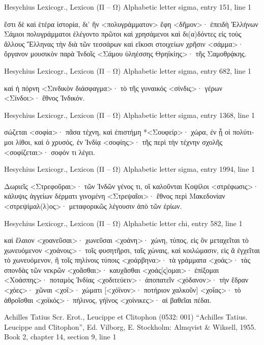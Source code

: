 \documentclass[12pt,letterpaper,twoside,final]{memoir}
\begin{document}
\begin{greek}
Hesychius Lexicogr., Lexicon (Π – Ω) 
Alphabetic letter sigma, entry 151, line 1

                                                        ἔστι δὲ καὶ ἑτέρα 
 ἱστορία, δι' ἣν <πολυγράμματον> ἔφη <δῆμον>· ἐπειδὴ Ἑλλήνων 
 Σάμιοι πολυγράμματοι ἐλέγοντο πρῶτοι καὶ χρησάμενοι καὶ δι(α)δόντες 
 εἰς τοὺς ἄλλους Ἕλληνας τὴν διὰ τῶν τεσσάρων καὶ εἴκοσι στοιχείων 
 χρῆσιν 
<σάμμα>· ὄργανον μουσικὸν παρὰ Ἰνδοῖς 
<Σάμου ὑληέσσης Θρηϊκίης>· τῆς Σαμοθρᾴκης. 



Hesychius Lexicogr., Lexicon (Π – Ω) 
Alphabetic letter sigma, entry 682, line 1

                             καὶ ἡ πόρνη 
<Σινδικὸν διάσφαγμα>· τὸ τῆς γυναικός 
<σίνδις>· γέρων 
<Σίνδοι>· ἔθνος Ἰνδικόν. 



Hesychius Lexicogr., Lexicon (Π – Ω) 
Alphabetic letter sigma, entry 1368, line 1

                                                 σώζεται 
<σοφία>· πᾶσα τέχνη, καὶ ἐπιστήμη 
*<Σουφείρ>· χώρα, ἐν ᾗ οἱ πολύτιμοι λίθοι, καὶ ὁ χρυσός, ἐν Ἰνδίᾳ 
<σοφίης>· τῆς περὶ τὴν τέχνην σχολῆς 
<σοφίζεται>· σοφόν τι λέγει. 



Hesychius Lexicogr., Lexicon (Π – Ω) 
Alphabetic letter sigma, entry 1994, line 1

                                          Δωριεῖς 
<Στρεφοῦραι>· τῶν Ἰνδῶν γένος τι, οἳ καλοῦνται Κοψίλοι 
<στρέφωσις>· κάλυψις ἀγγείων δέρματι γινομένη 
<Στρεψαῖοι>· ἔθνος περὶ Μακεδονίαν 
<στρεψίμαλ(λ)ος>· μεταφορικῶς λέγουσιν ἀπὸ τῶν ἐρίων. 



Hesychius Lexicogr., Lexicon (Π – Ω) 
Alphabetic letter chi, entry 582, line 1

                                               καὶ ἔλαιον 
<χοανεῦσαι>· χωνεῦσαι 
<χοάνη>· χώνη, τύπος, εἰς ὃν μεταχεῖται τὸ χωνευόμενον 
<χοάνοις>· τοῖς φυσητῆρσι, ταῖς χώναις, καὶ κοιλώμασιν, εἰς ἃ ἐγχεῖται 
 τὸ χωνευόμενον, ἢ τοῖς πηλίνοις τύποις 
<χοάρβηνα>· τὰ γράμματα 
<χοάς>· τὰς σπονδὰς τῶν νεκρῶν 
<χοᾶσθαι>· καυχᾶσθαι 
<χοάς[ς]ομαι>· ἐπίξομαι 
<Χοάσπης>· ποταμὸς Ἰνδίας 
<χοδιτεύειν>· ἀποπατεῖν 
<χόδανον>· τὴν ἕδραν 
<χόες>· χῶναι 
<χοΐ>· χώματι 
[<χόϊνον>· ποτήριον χαλκοῦν] 
<χοΐας>· τὸ ἀθροῖσθαι 
<χοϊκός>· πήλινος, γήϊνος 
<χοίνικες>· αἱ βαθεῖαι πέδαι. 


Achilles Tatius Scr. Erot., Leucippe et Clitophon (0532: 001)
“Achilles Tatius. Leucippe and Clitophon”, Ed. Vilborg, E.
Stockholm: Almqvist \& Wiksell, 1955.
Book 2, chapter 14, section 9, line 1


\end{greek}
\end{document}
